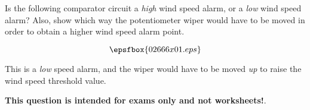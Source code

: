 

Is the following comparator circuit a {\it high} wind speed alarm, or a {\it low} wind speed alarm?  Also, show which way the potentiometer wiper would have to be moved in order to obtain a higher wind speed alarm point.

$$\epsfbox{02666x01.eps}$$







This is a {\it low} speed alarm, and the wiper would have to be moved {\it up} to raise the wind speed threshold value.







{\bf This question is intended for exams only and not worksheets!}.





